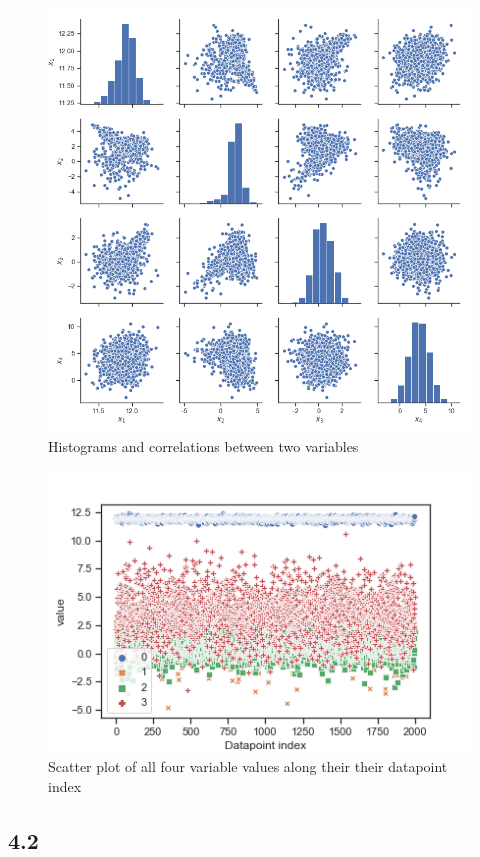 \documentclass[a4paper]{article}
\begin{document}
\begin{figure}[H]
\center
\includegraphics[width=0.7
\textwidth]{Images/figure_4_1_a.png}
\caption{Histograms and correlations between two variables}
\label{Fig:4_1_a}
\end{figure}

\begin{figure}[H]
\center
\includegraphics[width=0.8
\textwidth]{Images/figure_4_1_b.png}
\caption{Scatter plot of all four variable values along their their datapoint index}
\label{Fig:4_1_b}
\end{figure}


\subsection*{4.2}
\end{document}
